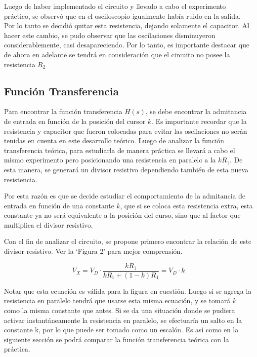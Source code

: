 \documentclass[12pt,oneside,a4paper]{article}
\begin{document}
Luego de haber implementado el circuito y llevado a cabo el experimento práctico,
se observó que en el osciloscopio igualmente había ruido en la salida. Por lo tanto se decidió 
quitar esta resistencia, dejando solamente el capacitor. Al hacer este cambio, se pudo observar que
las oscilaciones disminuyeron considerablemente, casi desapareciendo. Por lo tanto, es importante 
destacar que de ahora en adelante se tendrá en consideración que el circuito no posee la resistencia 
$R_2$

\subsection{Función Transferencia}

Para encontrar la función transferencia $H(s)$, se debe encontrar la admitancia de entrada
en función de la posición del cursor $k$. Es importante recordar que la resistencia y capacitor 
que fueron colocadas para evitar las oscilaciones no serán tenidas en cuenta en este desarrollo teórico.
Luego de analizar la función transferencia teórica, para estudiarla de manera práctica se 
llevará a cabo el mismo experimento pero posicionando una resistencia en paralelo a la $kR_1$. De 
esta manera, se generará un divisor resistivo dependiendo también de esta nueva resistencia.

Por esta razón es que se decide estudiar el comportamiento de la admitancia de entrada en función de 
una constante $k$, que si se coloca esta resistencia extra, esta constante ya no será equivalente 
a la posición del curso, sino que al factor que multiplica el divisor resistivo.

Con el fin de analizar el circuito, se propone primero encontrar la relación de este divisor resistivo.
Ver la \enquote*{Figura 2} para mejor comprensión.

\begin{equation}
    V_{X} = V_D \cdot \frac{k R_1}{k R_1 + (1-k)R_1} = V_D \cdot k
\end{equation}

Notar que esta ecuación es válida para la figura en cuestión. Luego si se agrega la resistencia en 
paralelo tendrá que usarse esta misma ecuación, y se tomará $k$ como la misma constante que antes. 
Si se da una situación donde se pudiera activar instantáneamente la resistencia en paralelo,
se efectuaría un salto en la constante k, por lo que puede ser tomado como un escalón. Es así como 
en la siguiente sección se podrá comparar la función transferencia teórica con la práctica.
\end{document}
